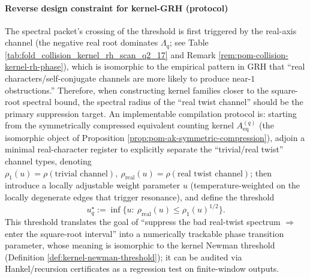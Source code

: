 \begin{remark}
\paragraph{Reverse design constraint for kernel-GRH (protocol)}
The spectral packet's crossing of the threshold is first triggered by the real-axis channel (the negative real root dominates \(\Lambda_q\); see Table \ref{tab:fold_collision_kernel_rh_scan_q2_17} and Remark \ref{rem:pom-collision-kernel-rh-phase}), which is isomorphic to the empirical pattern in GRH that ``real characters/self-conjugate channels are more likely to produce near-\(1\) obstructions.''
Therefore, when constructing kernel families closer to the square-root spectral bound, the spectral radius of the ``real twist channel'' should be the primary suppression target.
An implementable compilation protocol is: starting from the symmetrically compressed equivalent counting kernel \(A_{\mathrm{eq}}^{(q)}\) (the isomorphic object of Proposition \ref{prop:pom-ak-symmetric-compression}), adjoin a minimal real-character register to explicitly separate the ``trivial/real twist'' channel types, denoting
\(
\rho_1(u)=\rho(\text{trivial channel}),\ \rho_{\mathrm{real}}(u)=\rho(\text{real twist channel})
\);
then introduce a locally adjustable weight parameter \(u\) (temperature-weighted on the locally degenerate edges that trigger resonance), and define the threshold
\[
u_q^\star:=\inf\{u:\ \rho_{\mathrm{real}}(u)\le \rho_1(u)^{1/2}\}.
\]
This threshold translates the goal of ``suppress the bad real-twist spectrum \(\Rightarrow\) enter the square-root interval'' into a numerically trackable phase transition parameter, whose meaning is isomorphic to the kernel Newman threshold (Definition \ref{def:kernel-newman-threshold}); it can be audited via Hankel/recursion certificates as a regression test on finite-window outputs.
\end{remark}






